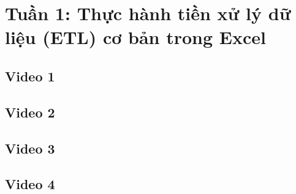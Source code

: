 \documentclass{article}
\begin{document}
\tableofcontents
\newpage
\listoffigures
\newpage
\section{Tuần 1: Thực hành tiền xử lý dữ liệu (ETL) cơ bản trong Excel}
\subsection{Video 1}

















\subsection{Video 2}













\subsection{Video 3}
\subsection{Video 4}






\end{document}
